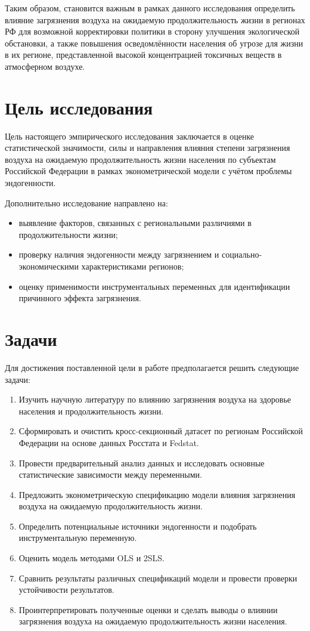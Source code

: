 \documentclass[11pt,a4paper]{article}
\begin{document}
Таким образом, становится важным в рамках данного исследования определить влияние загрязнения воздуха на ожидаемую продолжительность жизни в регионах РФ для возможной корректировки политики в сторону улучшения экологической обстановки, а также повышения осведомлённости населения об угрозе для жизни в их регионе, представленной высокой концентрацией токсичных веществ в атмосферном воздухе.

\section*{Цель исследования}

Цель настоящего эмпирического исследования заключается в оценке статистической значимости, силы и направления влияния степени загрязнения воздуха на ожидаемую продолжительность жизни населения по субъектам Российской Федерации в рамках эконометрической модели с учётом проблемы эндогенности.

Дополнительно исследование направлено на:
\begin{itemize}[leftmargin=2em]
  \item выявление факторов, связанных с региональными различиями в продолжительности жизни;
  \item проверку наличия эндогенности между загрязнением и социально-экономическими характеристиками регионов;
  \item оценку применимости инструментальных переменных для идентификации причинного эффекта загрязнения.
\end{itemize}

\section*{Задачи}

Для достижения поставленной цели в работе предполагается решить следующие задачи:
\begin{enumerate}[leftmargin=2em]
  \item Изучить научную литературу по влиянию загрязнения воздуха на здоровье населения и продолжительность жизни.
  \item Сформировать и очистить кросс-секционный датасет по регионам Российской Федерации на основе данных Росстата и Fedstat.
  \item Провести предварительный анализ данных и исследовать основные статистические зависимости между переменными.
  \item Предложить эконометрическую спецификацию модели влияния загрязнения воздуха на ожидаемую продолжительность жизни.
  \item Определить потенциальные источники эндогенности и подобрать инструментальную переменную.
  \item Оценить модель методами OLS и 2SLS.
  \item Сравнить результаты различных спецификаций модели и провести проверки устойчивости результатов.
  \item Проинтерпретировать полученные оценки и сделать выводы о влиянии загрязнения воздуха на ожидаемую продолжительность жизни населения.
\end{enumerate}
\end{document}
